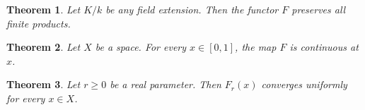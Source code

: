 \documentclass{article}
\newtheorem{theorem}{Theorem}
\begin{document}
\begin{theorem}Let $K/k$ be any field extension. Then the functor $F$ preserves all finite products.\end{theorem}
\begin{theorem}Let $X$ be a space. For every $x\in[0,1]$, the map $F$ is continuous at $x$.\end{theorem}
\begin{theorem}Let $r\geq0$ be a real parameter. Then $F_r(x)$ converges uniformly for every $x\in X$.\end{theorem}
\end{document}
